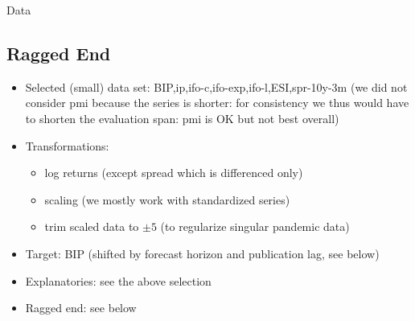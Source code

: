 \documentclass{beamer}
\begin{document}
\begin{frame} {Data}

\subsection{Ragged End}


\begin{itemize}
\item Selected (small) data set: BIP,ip,ifo-c,ifo-exp,ifo-l,ESI,spr-10y-3m (we did not consider pmi because the series is shorter: for consistency we thus would have to shorten the evaluation span: pmi is OK but not best overall)
\item Transformations: 
\begin{itemize}
\item log returns (except spread which is differenced only) 
\item scaling (we mostly work with standardized series)
\item trim scaled data to $\pm 5$ (to regularize singular pandemic data)
\end{itemize}
\item Target: BIP (shifted by forecast horizon and publication lag, see below)
\item Explanatories: see the above selection 
\item Ragged end: see below 
\end{itemize}
\end{frame}
\end{document}
